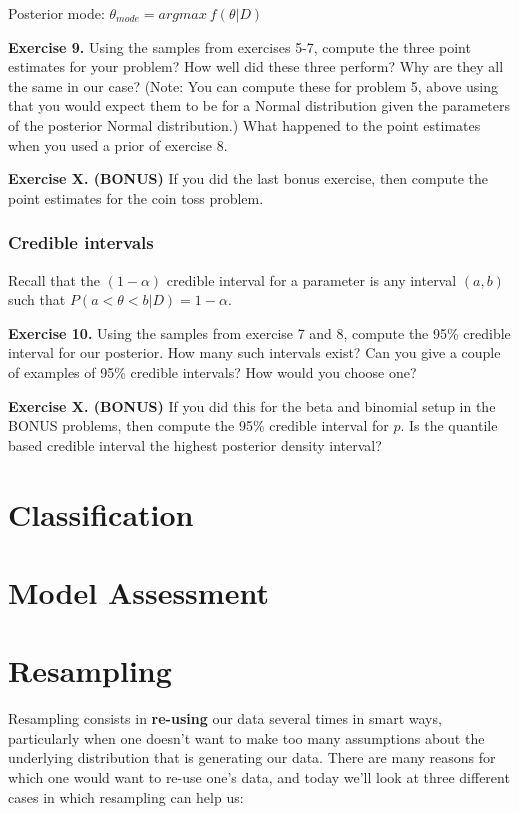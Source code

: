 \documentclass[
]{book}
\begin{document}
Posterior mode: \(\theta_{mode} = argmax~f(\theta | D)\)

\textbf{Exercise 9.} Using the samples from exercises 5-7, compute the three point estimates for your problem? How well did these three perform? Why are they all the same in our case? (Note: You can compute these for problem 5, above using that you would expect them to be for a Normal distribution given the parameters of the posterior Normal distribution.) What happened to the point estimates when you used a prior of exercise 8.

\textbf{Exercise X. (BONUS)} If you did the last bonus exercise, then compute the point estimates for the coin toss problem.

\hypertarget{credible-intervals}{%
\subsection{Credible intervals}\label{credible-intervals}}

Recall that the \((1-\alpha)\) credible interval for a parameter is any interval \((a, b)\) such that \(P(a < \theta < b | D) = 1-\alpha\).

\textbf{Exercise 10.} Using the samples from exercise 7 and 8, compute the 95\% credible interval for our posterior. How many such intervals exist? Can you give a couple of examples of 95\% credible intervals? How would you choose one?

\textbf{Exercise X. (BONUS)} If you did this for the beta and binomial setup in the BONUS problems, then compute the 95\% credible interval for \(p\). Is the quantile based credible interval the highest posterior density interval?

\hypertarget{classification}{%
\chapter{Classification}\label{classification}}

\hypertarget{model-assessment}{%
\chapter{Model Assessment}\label{model-assessment}}

\hypertarget{resampling}{%
\chapter{Resampling}\label{resampling}}

Resampling consists in \textbf{re-using} our data several times in smart ways, particularly when one doesn't want to make too many assumptions about the underlying distribution that is generating our data. There are many reasons for which one would want to re-use one's data, and today we'll look at three different cases in which resampling can help us:
\end{document}
